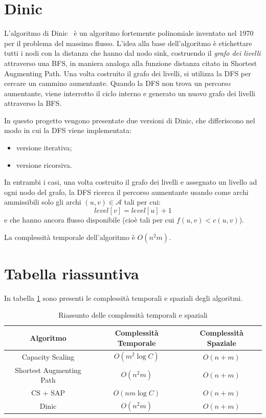 \documentclass[11pt]{report}
\newcommand{\set}[1]{\mathcal{#1}}
\begin{document}
    \section{Dinic}\label{sec:Dinic}
    L'algoritmo di Dinic~\cite{Dinic} è un algoritmo fortemente polinomiale inventato nel 1970 per il problema del massimo flusso.
    L'idea alla base dell'algoritmo è etichettare tutti i nodi con la distanza che hanno dal nodo sink, costruendo il \textit{grafo dei livelli} attraverso una BFS, in maniera analoga alla funzione distanza citato in Shortest Augmenting Path.
    Una volta costruito il grafo dei livelli, si utilizza la DFS per cercare un cammino aumentante.
    Quando la DFS non trova un percorso aumentante, viene interrotto il ciclo interno e generato un nuovo grafo dei livelli attraverso la BFS.

    In questo progetto vengono presentate due versioni di Dinic, che differiscono nel modo in cui la DFS viene implementata:
    \begin{itemize}
        \item versione iterativa;
        \item versione ricorsiva.
    \end{itemize}

    In entrambi i casi, una volta costruito il grafo dei livelli e assegnato un livello ad ogni nodo del grafo, la DFS ricerca il percorso aumentante usando come archi ammissibili solo gli archi $(u,v)\in \set A$ tali per cui:
    $$level[v]=level[u]+1$$
    e che hanno ancora flusso disponibile (cioè tali per cui $f(u,v)<c(u,v)$).

    La complessità temporale dell'algoritmo è $O(n^{2}m)$.

    \clearpage

    \section{Tabella riassuntiva}\label{sec:tabella}
    In tabella \ref{tab:complessità} sono presenti le complessità temporali e spaziali degli algoritmi.

    \begin{table}[h]
        \centering
        \caption{Riassunto delle complessità temporali e spaziali}
        \label{tab:complessità}
        \begin{tabular}{|c|cc|}
            \hline
            Algoritmo & Complessità Temporale & Complessità Spaziale\\\hline
            Capacity Scaling & $O(m^2\log C)$ & $O(n+m)$\\
            Shortest Augmenting Path & $O(n^{2}m)$ & $O(n+m)$\\
            CS + SAP & $O(nm\log C)$ & $O(n+m)$\\
            Dinic & $O(n^{2}m)$ & $O(n+m)$\\
            \hline
        \end{tabular}
    \end{table}
\end{document}
